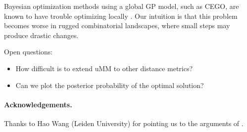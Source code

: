 \documentclass[runningheads]{llncs}
\begin{document}
Bayesian optimization methods using a global GP model, such as CEGO, are known
to have trouble optimizing locally \citep{EriPeaGar2019scalable}. Our
intuition is that this problem becomes worse in rugged combinatorial
landscapes, where small steps may produce drastic changes.

Open questions:
\begin{itemize}
\item How difficult is to extend uMM to other distance metrics?
\item Can we plot the posterior probability of the optimal solution?
\end{itemize}

\paragraph*{Acknowledgements.}

Thanks to Hao Wang (Leiden University) for pointing us to the arguments of
\citet{EriPeaGar2019scalable}.




\renewcommand{\doi}[1]{doi:\hspace{.16667em plus .08333em}\discretionary{}{}{}\href{https://doi.org/#1}{\urlstyle{rm}\nolinkurl{#1}}}


\end{document}
